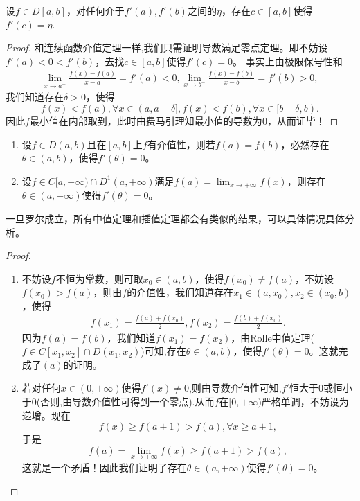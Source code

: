 \documentclass[../../main.tex]{subfiles}%
\begin{document}
\begin{theorem}\label{theorem:导数介值定理}
设\(f \in D[a,b]\)，对任何介于\(f'(a),f'(b)\)之间的\(\eta\)，存在\(c \in [a,b]\)使得\(f'(c)=\eta\).
\end{theorem}
\begin{proof}
和连续函数介值定理一样,我们只需证明导数满足零点定理。即不妨设\(f'(a) < 0 < f'(b)\)，去找\(c \in [a,b]\)使得\(f'(c)=0\)。
事实上由极限保号性和
\begin{align*}
\lim_{x \to a^{+}}\frac{f(x)-f(a)}{x - a}=f'(a)<0,\lim_{x \to b^{-}}\frac{f(x)-f(b)}{x - b}=f'(b)>0,
\end{align*}
我们知道存在\(\delta>0\)，使得
\[f(x)<f(a),\forall x \in (a,a + \delta],f(x)<f(b),\forall x \in [b - \delta,b).\]
因此\(f\)最小值在内部取到，此时由费马引理知最小值的导数为\(0\)，从而证毕！
\end{proof}

\begin{theorem}[加强的Rolle中值定理]\label{theorem:加强的Rolle中值定理}
\begin{enumerate}[(1)]
\item 设\(f \in D(a,b)\)且在\([a,b]\)上\(f\)有介值性，则若\(f(a)=f(b)\)，必然存在\(\theta \in (a,b)\)，使得\(f'(\theta)=0\)。

\item 设\(f \in C[a,+\infty)\cap D^{1}(a,+\infty)\)满足\(f(a)=\lim_{x \to +\infty}f(x)\)，则存在\(\theta \in (a,+\infty)\)使得\(f'(\theta)=0\)。
\end{enumerate}
\end{theorem}
\begin{note}
一旦罗尔成立，所有中值定理和插值定理都会有类似的结果，可以具体情况具体分析。
\end{note}
\begin{proof}
\begin{enumerate}[(1)]
\item 不妨设\(f\)不恒为常数，则可取\(x_0 \in (a,b)\)，使得\(f(x_0)\neq f(a)\)，不妨设\(f(x_0)>f(a)\)，则由\(f\)的介值性，我们知道存在\(x_1 \in (a,x_0),x_2 \in (x_0,b)\)，使得
\begin{align*}
f(x_1)=\frac{f(a)+f(x_0)}{2},f(x_2)=\frac{f(b)+f(x_0)}{2}.
\end{align*}
因为\(f(a)=f(b)\)，我们知道\(f(x_1)=f(x_2)\)，由Rolle中值定理($f\in C[x_1,x_2]\cap D(x_1,x_2)$)可知,存在\(\theta \in (a,b)\)，使得\(f'(\theta)=0\)。这就完成了\((a)\)的证明。

\item 若对任何\(x \in (0,+\infty)\)使得\(f'(x)\neq 0\),则由导数介值性可知,$f'$恒大于0或恒小于0(否则,由导数介值性可得到一个零点).从而\(f\)在\([0,+\infty)\)严格单调，不妨设为递增。现在
\[f(x)\geqslant f(a + 1)>f(a),\forall x\geqslant a + 1,\]
于是
\[f(a)=\lim_{x \to +\infty}f(x)\geqslant f(a + 1)>f(a),\]
这就是一个矛盾！因此我们证明了存在\(\theta \in (a,+\infty)\)使得\(f'(\theta)=0\)。   
\end{enumerate} 
\end{proof}
\end{document}
